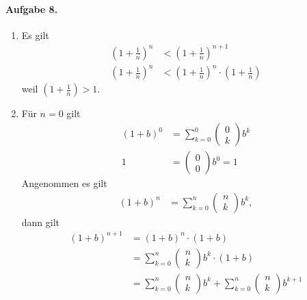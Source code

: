 \documentclass{article}
\begin{document}
\paragraph{Aufgabe 8.}
\begin{enumerate}
    \item Es gilt
    \begin{align*}
        \left(1 + \frac{1}{n}\right)^n &< \left(1 + \frac{1}{n}\right)^{n + 1} \\
        \left(1 + \frac{1}{n}\right)^n &< \left(1 + \frac{1}{n}\right)^{n} \cdot \left(1 + \frac{1}{n}\right)
    \end{align*}
    weil $\left(1 + \frac{1}{n}\right) > 1$.

    \item Für $n = 0$ gilt
    \begin{align*}
        (1 + b)^0 &= \sum_{k = 0}^{0} \begin{pmatrix}
            0 \\k
        \end{pmatrix}b^k \\
        1 &= \begin{pmatrix}
            0 \\0
        \end{pmatrix}b^0  = 1
    \end{align*}
    Angenommen es gilt
    \begin{align*}
        (1 + b)^n &= \sum_{k = 0}^{n} \begin{pmatrix}
            n \\k
        \end{pmatrix}b^k,
    \end{align*}
    dann gilt
    \begin{align*}
        (1 + b)^{n + 1} &= (1 + b)^n \cdot (1 + b) \\
        &= \sum_{k = 0}^{n} \begin{pmatrix}
            n \\k
        \end{pmatrix}b^k \cdot (1 + b) \\
        &= \sum_{k = 0}^{n} \begin{pmatrix}
            n \\k
        \end{pmatrix}b^k + \sum_{k = 0}^{n} \begin{pmatrix}
            n \\k
        \end{pmatrix}b^{k + 1} \\

\end{align*}
\end{enumerate}
\end{document}
